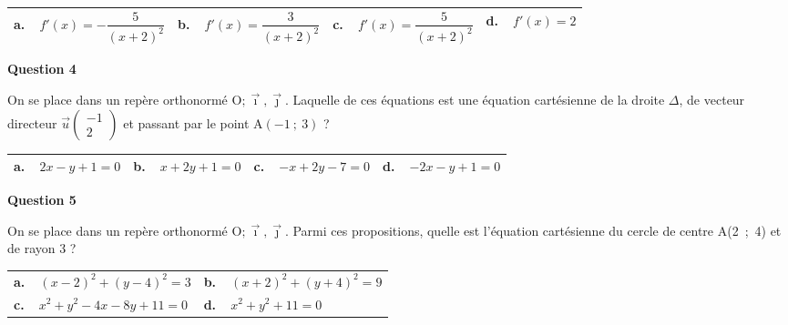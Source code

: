 \documentclass[10pt]{article}
\providecommand{\vect}[1]{\overrightarrow{#1}}
\providecommand{\Oij}{\(\mathrm{O};\vec{\imath},\vec{\jmath}\)}
\begin{document}
\begin{center}
\begin{tabularx}{\linewidth}{|*{4}{X|}}\hline
\textbf{a.~~}$f'(x) = - \dfrac{5}{(x + 2)^2}$&\textbf{b.~~}$f'(x) =  \dfrac{3}{(x + 2)^2}$&\textbf{c.~~}$f'(x) = \dfrac{5}{(x + 2)^2}$&\textbf{d.~~}$f'(x) = 2$\rule[-3pt]{0mm}{7mm}\\ \hline
\end{tabularx}
\end{center}

\medskip

\textbf{Question 4}

\medskip

On se place dans un repère orthonormé \Oij. Laquelle de ces équations est une
équation cartésienne de la droite $\Delta$, de vecteur directeur $\vect{u}\begin{pmatrix}-1\\2\end{pmatrix}$ et passant par le point
A$(-1~;~3)$ ?

\begin{center}
\begin{tabularx}{\linewidth}{|*{4}{X|}}\hline
\textbf{a.~~}$2x - y + 1 = 0$&\textbf{b.~~}$x + 2y + 1 = 0$&\textbf{c.~~}$-x + 2y- 7= 0$&\textbf{d.~~}$-2x - y + 1 = 0$\\ \hline
\end{tabularx}
\end{center}

\medskip

\textbf{Question 5}

\medskip

On se place dans un repère orthonormé \Oij. Parmi ces propositions, quelle est l'équation cartésienne du cercle de centre A(2~;~4) et de rayon 3 ?

\begin{center}
\begin{tabularx}{\linewidth}{|*{2}{X|}}\hline
\textbf{a.~~}$(x- 2)^2+(y- 4)^2 = 3$&\textbf{b.~~}$(x+2)^2 + (y+4)^2 = 9$\\
\textbf{c.~~}$x^2 + y^2 - 4x - 8y+ 11 = 0$&\textbf{d.~~}$x^2 + y^2 + 11 = 0$\\ \hline
\end{tabularx}
\end{center}

\bigskip
\end{document}
